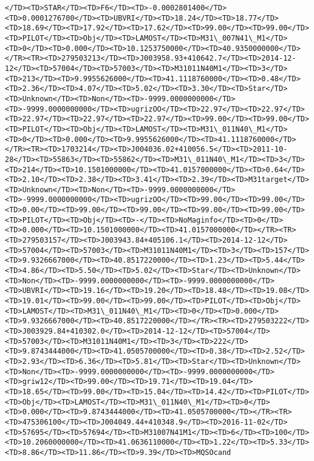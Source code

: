 \documentclass[11pt]{article}
\begin{document}
\begin{Verbatim}[commandchars=\\\{\}]
</TD><TD>STAR</TD><TD>F6</TD><TD>-0.0002801400</TD><TD>0.0001276700</TD><TD>UBVRI</TD><TD>18.24</TD><TD>18.77</TD><TD>18.69</TD><TD>17.92</TD><TD>17.62</TD><TD>99.00</TD><TD>99.00</TD><TD>PILOT</TD><TD>Obj</TD><TD>LAMOST</TD><TD>M31\_007N41\_M1</TD><TD>0</TD><TD>0.000</TD><TD>10.1253750000</TD><TD>40.9350000000</TD></TR><TR><TD>279503213</TD><TD>J003958.93+410642.7</TD><TD>2014-12-12</TD><TD>57004</TD><TD>57003</TD><TD>M31011N40M1</TD><TD>3</TD><TD>213</TD><TD>9.9955626000</TD><TD>41.1118760000</TD><TD>0.48</TD><TD>2.36</TD><TD>4.07</TD><TD>5.02</TD><TD>3.30</TD><TD>Star</TD><TD>Unknown</TD><TD>Non</TD><TD>-9999.0000000000</TD><TD>-9999.0000000000</TD><TD>ugrizOO</TD><TD>22.97</TD><TD>22.97</TD><TD>22.97</TD><TD>22.97</TD><TD>22.97</TD><TD>99.00</TD><TD>99.00</TD><TD>PILOT</TD><TD>Obj</TD><TD>LAMOST</TD><TD>M31\_011N40\_M1</TD><TD>0</TD><TD>0.000</TD><TD>9.9955626000</TD><TD>41.1118760000</TD></TR><TR><TD>1703214</TD><TD>J004036.02+410056.5</TD><TD>2011-10-28</TD><TD>55863</TD><TD>55862</TD><TD>M31\_011N40\_M1</TD><TD>3</TD><TD>214</TD><TD>10.1501000000</TD><TD>41.0157000000</TD><TD>0.64</TD><TD>2.10</TD><TD>2.38</TD><TD>3.41</TD><TD>2.39</TD><TD>M31target</TD><TD>Unknown</TD><TD>Non</TD><TD>-9999.0000000000</TD><TD>-9999.0000000000</TD><TD>ugrizOO</TD><TD>99.00</TD><TD>99.00</TD><TD>0.00</TD><TD>99.00</TD><TD>99.00</TD><TD>99.00</TD><TD>99.00</TD><TD>PILOT</TD><TD>Obj</TD><TD>-</TD><TD>NoMaginfo</TD><TD>0</TD><TD>0.000</TD><TD>10.1501000000</TD><TD>41.0157000000</TD></TR><TR><TD>279503157</TD><TD>J003943.84+405106.1</TD><TD>2014-12-12</TD><TD>57004</TD><TD>57003</TD><TD>M31011N40M1</TD><TD>3</TD><TD>157</TD><TD>9.9326667000</TD><TD>40.8517220000</TD><TD>1.23</TD><TD>5.44</TD><TD>4.86</TD><TD>5.50</TD><TD>5.02</TD><TD>Star</TD><TD>Unknown</TD><TD>Non</TD><TD>-9999.0000000000</TD><TD>-9999.0000000000</TD><TD>UBVRI</TD><TD>19.16</TD><TD>19.20</TD><TD>18.48</TD><TD>19.08</TD><TD>19.01</TD><TD>99.00</TD><TD>99.00</TD><TD>PILOT</TD><TD>Obj</TD><TD>LAMOST</TD><TD>M31\_011N40\_M1</TD><TD>0</TD><TD>0.000</TD><TD>9.9326667000</TD><TD>40.8517220000</TD></TR><TR><TD>279503222</TD><TD>J003929.84+410302.0</TD><TD>2014-12-12</TD><TD>57004</TD><TD>57003</TD><TD>M31011N40M1</TD><TD>3</TD><TD>222</TD><TD>9.8743444000</TD><TD>41.0505700000</TD><TD>0.38</TD><TD>2.52</TD><TD>2.93</TD><TD>6.36</TD><TD>5.81</TD><TD>Star</TD><TD>Unknown</TD><TD>Non</TD><TD>-9999.0000000000</TD><TD>-9999.0000000000</TD><TD>griw12</TD><TD>99.00</TD><TD>19.71</TD><TD>19.04</TD><TD>18.65</TD><TD>99.00</TD><TD>15.04</TD><TD>14.42</TD><TD>PILOT</TD><TD>Obj</TD><TD>LAMOST</TD><TD>M31\_011N40\_M1</TD><TD>0</TD><TD>0.000</TD><TD>9.8743444000</TD><TD>41.0505700000</TD></TR><TR><TD>475306100</TD><TD>J004049.44+410348.9</TD><TD>2016-11-02</TD><TD>57695</TD><TD>57694</TD><TD>M31007N41M1</TD><TD>6</TD><TD>100</TD><TD>10.2060000000</TD><TD>41.0636110000</TD><TD>1.22</TD><TD>5.33</TD><TD>8.86</TD><TD>11.86</TD><TD>9.39</TD><TD>MQSOcand  
\end{Verbatim}
\end{document}
